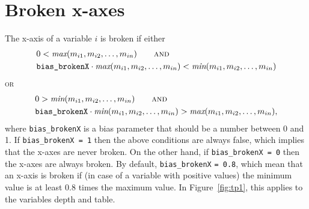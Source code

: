 \documentclass[11pt, fleqn, a4paper]{article}\usepackage{graphicx, color}
\begin{document}
\newpage
\section{Broken x-axes}\label{secbrokenx}

The x-axis of a variable $i$ is broken if
either
\begin{align*}
& 0 < \textit{max}(m_{i1}, m_{i2},\ldots, m_{in}) \qquad \textsc{and}\\
& \mbox{{\tt bias\_brokenX}} \cdot \textit{max}(m_{i1}, m_{i2},\ldots, m_{in}) < \textit{min}(m_{i1}, m_{i2},\ldots, m_{in}) 
\end{align*}
\textsc{or}
\begin{align*}
& 0 > \textit{min}(m_{i1}, m_{i2},\ldots, m_{in}) \qquad \textsc{and}\\
& \mbox{{\tt bias\_brokenX}} \cdot \textit{min}(m_{i1}, m_{i2},\ldots, m_{in}) > \textit{max}(m_{i1}, m_{i2},\ldots, m_{in}),
\end{align*}
where {\tt bias\_brokenX} is a bias parameter that should be a number between 0 and 1. If {\tt bias\_brokenX = 1} then the above conditions are always false, which implies that the x-axes are never broken. On the other hand, if {\tt bias\_brokenX = 0} then the x-axes are always broken. By default, {\tt bias\_brokenX} {\tt= 0.8}, which mean that an x-axis is broken if (in case of a variable with positive values) the minimum value is at least 0.8 times the maximum value. In Figure~\ref{fig:tp1}, this applies to the variables depth and table.
\end{document}
